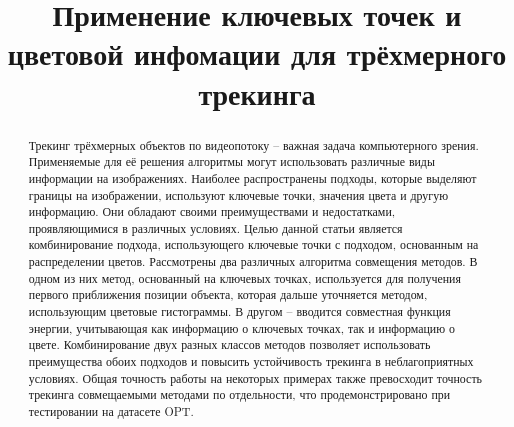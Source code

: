 \documentclass[a4paper, 14pt]{article}
\title{
Применение ключевых точек и цветовой инфомации для трёхмерного трекинга
}
\begin{document}
\maketitle
\begin{abstract}
Трекинг трёхмерных объектов по видеопотоку -- важная задача компьютерного зрения. Применяемые для её решения алгоритмы могут использовать различные виды информации на изображениях. Наиболее распространены подходы, которые выделяют границы на изображении, используют ключевые точки, значения цвета и другую информацию. Они обладают своими преимуществами и недостатками, проявляющимися в различных условиях. Целью данной статьи является комбинирование подхода, использующего ключевые точки с подходом, основанным на распределении цветов. Рассмотрены два различных алгоритма совмещения методов. В одном из них метод, основанный на ключевых точках, используется для получения первого приближения позиции объекта, которая дальше уточняется методом, использующим цветовые гистограммы. В другом -- вводится совместная функция энергии, учитывающая как информацию о ключевых точках, так и информацию о цвете. Комбинирование двух разных классов методов позволяет использовать преимущества обоих подходов и повысить устойчивость трекинга в неблагоприятных условиях. Общая точность работы на некоторых примерах также превосходит точность трекинга совмещаемыми методами по отдельности, что продемонстрировано при тестировании на датасете OPT.
\end{abstract}
\pagebreak
\tableofcontents
\newpage







\newpage


\end{document}
